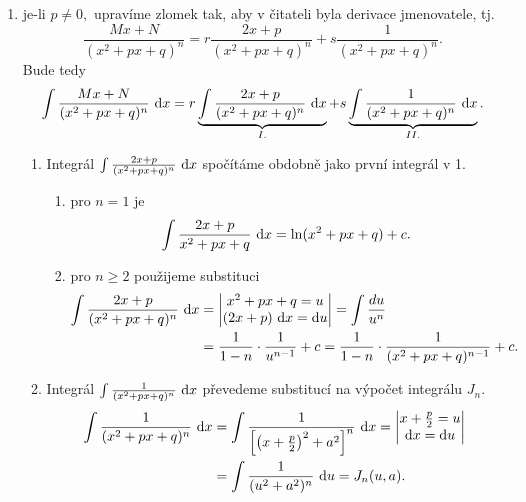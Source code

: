 \begin{pozn}
\begin{enumerate}[1.]
\begin{enumerate}[$I.$]
$$    $$
    $J_2$ určíme rekurentně tak, že vyjádříme metodou \textit{per partes} $J_1$ ($u=J_1$, $v^\prime =1$),
    $J_3$ tak, že vyjádříme metodou \textit{per partes} $J_2$, \dots
    \end{enumerate}
   	\item je-li $p\ne 0,$ upravíme zlomek tak, aby v čitateli byla derivace jmenovatele, tj.
    $$\frac{Mx+N}{(x^2+px+q)^n}=r\frac{2x+p}{(x^2+px+q)^n}+s \frac{1}{(x^2+px+q)^n}.$$
    Bude tedy
    $$\int \frac{Mx+N}{(x^2+px+q)^n}\, \mathop{}\!\mathrm{d} x =r\underbrace{\int \frac{2x+p}{(x^2+px+q)^n}\, \mathop{}\!\mathrm{d} x}_{I.}+s \underbrace{\int \frac{1}{(x^2+px+q)^n}\, \mathop{}\!\mathrm{d} x}_{II.}.$$
    \begin{enumerate}[$I.$]
    \item Integrál $\int \frac{2x+p}{(x^2+px+q)^n}\, \mathop{}\!\mathrm{d} x$ spočítáme obdobně jako první integrál v 1.
    \begin{enumerate}[$i.$]
    \item pro $n=1$ je
    $$\int \frac{2x+p}{x^2+px+q}\, \mathop{}\!\mathrm{d} x = \operatorname{ln}(x^2+px+q)+c.$$
   	\item pro $n \geq 2$ použijeme substituci
    \begin{align*}
    \int \frac{2x+p}{(x^2+px+q)^n}\, \mathop{}\!\mathrm{d} x &= \begin{vmatrix}
x^2+px+q=u \\
(2x+p)\, \mathop{}\!\mathrm{d} x = \mathop{}\!\mathrm{d} u
\end{vmatrix}=\int \frac{du}{u^n}\\
& = \frac{1}{1-n}\cdot \frac{1}{u^{n-1}}+c = \frac{1}{1-n}\cdot \frac{1}{(x^2+px+q)^{n-1}}+c.
    \end{align*}
    \end{enumerate}
   	\item Integrál $\int \frac{1}{(x^2+px+q)^n}\, \mathop{}\!\mathrm{d} x$ převedeme substitucí na výpočet
    integrálu $J_n$.
    \begin{align*}
        \int \frac{1}{(x^2+px+q)^n}\, \mathop{}\!\mathrm{d} x &= \int \frac{1}{\left [ \left ( x+\frac{p}{2} \right )^2 +a^2 \right ]^n }\, \mathop{}\!\mathrm{d} x = \begin{vmatrix}
            x+\frac{p}{2}=u \\
            \mathop{}\!\mathrm{d} x = \mathop{}\!\mathrm{d} u
        \end{vmatrix} \\
        &= \int \frac{1}{(u^2+a^2)^n}\, \mathop{}\!\mathrm{d} u  = J_n(u,a).
    \end{align*}
    \end{enumerate}
\end{enumerate}
\end{pozn}

